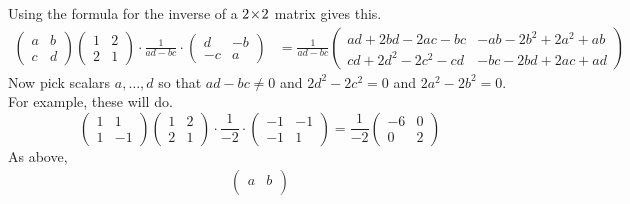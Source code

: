 \begin{exercises}
\begin{answer}
\begin{exparts}
      \partsitem Using the formula for the inverse of a $2 \! \times \! 2$
        matrix gives this.
        \begin{align*}
           \begin{pmatrix}
              a  &b  \\
              c  &d
           \end{pmatrix}
           \begin{pmatrix}
              1  &2  \\
              2  &1
           \end{pmatrix}
           \cdot\frac{1}{ad-bc}\cdot
           \begin{pmatrix}
              d  &-b \\
             -c  &a
           \end{pmatrix}
           &=\frac{1}{ad-bc}
           \begin{pmatrix}
              ad+2bd-2ac-bc    &-ab-2b^2+2a^2+ab \\
              cd+2d^2-2c^2-cd  &-bc-2bd+2ac+ad
           \end{pmatrix}
        \end{align*}
        Now pick scalars \( a,\ldots,d \) so that
        \( ad-bc\neq 0 \) and \( 2d^2-2c^2=0 \) and \( 2a^2-2b^2=0 \).
        For example, these will do.
        \begin{equation*}
          \begin{pmatrix}
            1  &1  \\
            1  &-1
          \end{pmatrix}
          \begin{pmatrix}
            1  &2  \\
            2  &1
          \end{pmatrix}
          \cdot\frac{1}{-2}\cdot
          \begin{pmatrix}
            -1  &-1  \\
            -1  &1
          \end{pmatrix}
          =
          \frac{1}{-2}
          \begin{pmatrix}
            -6  &0   \\
             0  &2
          \end{pmatrix}
        \end{equation*}
      \partsitem As above,
        \begin{align*}
           \begin{pmatrix}
              a  &b  \\

\end{pmatrix}
\end{align*}
\end{exparts}
\end{answer}
\end{exercises}
